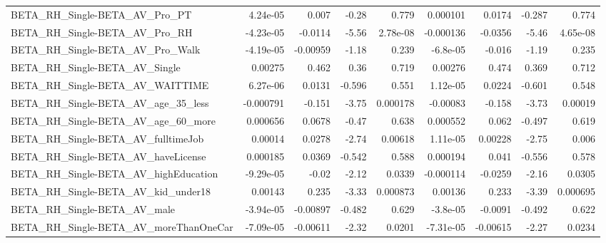\begin{tabular}{lrrrrrrrr}
BETA\_RH\_Single-BETA\_AV\_Pro\_PT                      &    4.24e-05 &        0.007 &     -0.28 &    0.779 &   0.000101 &      0.0174 &       -0.287 &         0.774 \\
BETA\_RH\_Single-BETA\_AV\_Pro\_RH                      &   -4.23e-05 &      -0.0114 &     -5.56 & 2.78e-08 &  -0.000136 &     -0.0356 &        -5.46 &      4.65e-08 \\
BETA\_RH\_Single-BETA\_AV\_Pro\_Walk                    &   -4.19e-05 &     -0.00959 &     -1.18 &    0.239 &   -6.8e-05 &      -0.016 &        -1.19 &         0.235 \\
BETA\_RH\_Single-BETA\_AV\_Single                      &     0.00275 &        0.462 &      0.36 &    0.719 &    0.00276 &       0.474 &        0.369 &         0.712 \\
BETA\_RH\_Single-BETA\_AV\_WAITTIME                    &    6.27e-06 &       0.0131 &    -0.596 &    0.551 &   1.12e-05 &      0.0224 &       -0.601 &         0.548 \\
BETA\_RH\_Single-BETA\_AV\_age\_35\_less                 &   -0.000791 &       -0.151 &     -3.75 & 0.000178 &   -0.00083 &      -0.158 &        -3.73 &       0.00019 \\
BETA\_RH\_Single-BETA\_AV\_age\_60\_more                 &    0.000656 &       0.0678 &     -0.47 &    0.638 &   0.000552 &       0.062 &       -0.497 &         0.619 \\
BETA\_RH\_Single-BETA\_AV\_fulltimeJob                 &     0.00014 &       0.0278 &     -2.74 &  0.00618 &   1.11e-05 &     0.00228 &        -2.75 &         0.006 \\
BETA\_RH\_Single-BETA\_AV\_haveLicense                 &    0.000185 &       0.0369 &    -0.542 &    0.588 &   0.000194 &       0.041 &       -0.556 &         0.578 \\
BETA\_RH\_Single-BETA\_AV\_highEducation               &   -9.29e-05 &        -0.02 &     -2.12 &   0.0339 &  -0.000114 &     -0.0259 &        -2.16 &        0.0305 \\
BETA\_RH\_Single-BETA\_AV\_kid\_under18                 &     0.00143 &        0.235 &     -3.33 & 0.000873 &    0.00136 &       0.233 &        -3.39 &      0.000695 \\
BETA\_RH\_Single-BETA\_AV\_male                        &   -3.94e-05 &     -0.00897 &    -0.482 &    0.629 &   -3.8e-05 &     -0.0091 &       -0.492 &         0.622 \\
BETA\_RH\_Single-BETA\_AV\_moreThanOneCar              &   -7.09e-05 &     -0.00611 &     -2.32 &   0.0201 &  -7.31e-05 &    -0.00615 &        -2.27 &        0.0234 \\

\end{tabular}
